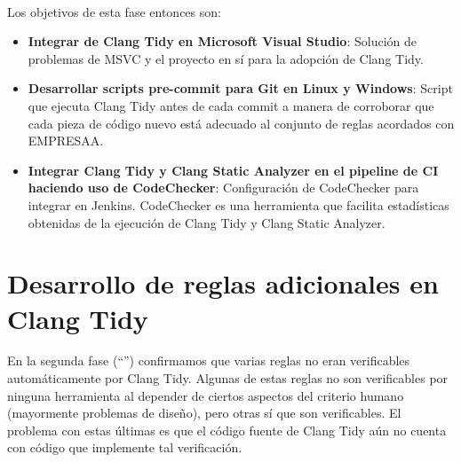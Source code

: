 \documentclass[12pt]{extreport} %
\begin{document}
\paragraph{}
Los objetivos de esta fase entonces son:
\begin{itemize}
\item \textbf{Integrar de Clang Tidy en Microsoft Visual Studio}:
  Solución de problemas de MSVC y el proyecto en sí para la adopción
  de Clang Tidy.
\item \textbf{Desarrollar scripts pre-commit para Git en Linux y
  Windows}: Script que ejecuta Clang Tidy antes de cada commit a
  manera de corroborar que cada pieza de código nuevo está adecuado al
  conjunto de reglas acordados con EMPRESAA.
\item \textbf{Integrar Clang Tidy y Clang Static Analyzer en el
  pipeline de CI haciendo uso de CodeChecker}: Configuración de
  CodeChecker para integrar en Jenkins.  CodeChecker es una
  herramienta que facilita estadísticas obtenidas de la ejecución de
  Clang Tidy y Clang Static Analyzer.
\end{itemize}

\section{Desarrollo de reglas adicionales en Clang Tidy}

En la segunda fase (``'') confirmamos que varias
reglas no eran verificables automáticamente por Clang Tidy. Algunas de
estas reglas no son verificables por ninguna herramienta al depender
de ciertos aspectos del criterio humano (mayormente problemas de
diseño), pero otras sí que son verificables. El problema con estas
últimas es que el código fuente de Clang Tidy aún no cuenta con
código que implemente tal verificación.
\end{document}
